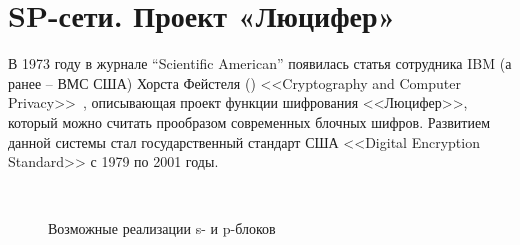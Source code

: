 \section{SP-сети. Проект «Люцифер»}\label{section-project-lucifer}

В 1973 году в журнале \foreignlanguage{english}{``Scientific American''} появилась статья сотрудника IBM (а ранее -- ВМС США) Хорста Фейстеля () <<Cryptography and Computer Privacy>>~\cite{Feistel:1973}, описывающая проект функции шифрования <<Люцифер>>, который можно считать прообразом современных блочных шифров. Развитием данной системы стал государственный стандарт США <<Digital Encryption Standard>> с 1979 по 2001 годы.

\begin{figure}[!t]
    \centering
    ~~~
		\caption{Возможные реализации s- и p-блоков}
\end{figure}

